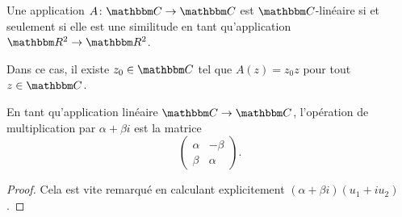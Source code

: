 \begin{lemma}
    Une application \( A\colon \eC\to \eC\) est \( \eC\)-linéaire si et seulement si elle est une similitude en tant qu'application \( \eR^2\to \eR^2\).

    Dans ce cas, il existe \( z_0\in \eC\) tel que \( A(z)=z_0z\) pour tout \( z\in \eC\).
\end{lemma}

\begin{lemma}       \label{LEMooJNFEooZCbJMo}
    En tant qu'application linéaire \( \eC\to \eC\), l'opération de multiplication par \( \alpha+\beta i\) est la matrice
    \begin{equation}
        \begin{pmatrix}
            \alpha    &   -\beta    \\ 
            \beta    &   \alpha    
        \end{pmatrix}.
    \end{equation}
\end{lemma}

\begin{proof}
    Cela est vite remarqué en calculant explicitement \( (\alpha+\beta i)(u_1+iu_2)\).
\end{proof}

